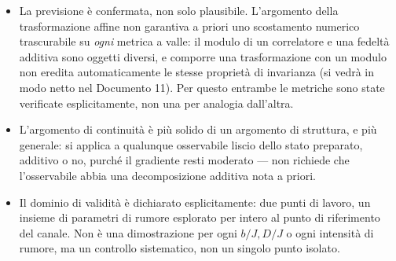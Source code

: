 \documentclass[11pt,a4paper]{article}
\begin{document}
\begin{itemize}[leftmargin=1.5em,itemsep=3pt]
\item La previsione è confermata, non solo plausibile. L'argomento della
trasformazione affine non garantiva a priori uno scostamento numerico
trascurabile su \emph{ogni} metrica a valle: il modulo di un correlatore e
una fedeltà additiva sono oggetti diversi, e comporre una trasformazione con
un modulo non eredita automaticamente le stesse proprietà di invarianza (si
vedrà in modo netto nel Documento 11). Per questo entrambe le metriche sono
state verificate esplicitamente, non una per analogia dall'altra.
\item L'argomento di continuità è più solido di un argomento di struttura, e
più generale: si applica a qualunque osservabile liscio dello stato preparato,
additivo o no, purché il gradiente resti moderato --- non richiede che
l'osservabile abbia una decomposizione additiva nota a priori.
\item Il dominio di validità è dichiarato esplicitamente: due punti di
lavoro, un insieme di parametri di rumore esplorato per intero al punto di
riferimento del canale. Non è una dimostrazione per ogni $b/J,D/J$ o ogni
intensità di rumore, ma un controllo sistematico, non un singolo punto
isolato.
\end{itemize}

\end{document}
